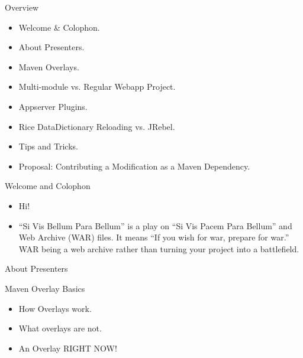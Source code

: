 \documentclass[xcolor=dvipsnames,14pt,professionalfonts]{beamer}
\begin{document}
\begin{frame}{Overview}
  \begin{itemize}
  \item Welcome \& Colophon.
  \item About Presenters.
  \item Maven Overlays.
  \item Multi-module vs. Regular Webapp Project.
  \item Appserver Plugins.
  \item Rice DataDictionary Reloading vs. JRebel.
  \item Tips and Tricks.
  \item Proposal: Contributing a Modification as a Maven Dependency.
  \end{itemize}
\end{frame}

\begin{frame}{Welcome and Colophon}
  \begin{itemize}
    \item Hi!
    \item ``Si Vis Bellum Para Bellum'' is a play on ``Si Vis Pacem
      Para Bellum'' and Web Archive (WAR) files. It means ``If you
      wish for war, prepare for war.'' WAR being a web archive rather than turning your project into a battlefield.
  \end{itemize}
\end{frame}

\begin{frame}{About Presenters}
\end{frame}

\begin{frame}{Maven Overlay Basics}
  \begin{itemize}
    \item How Overlays work.
    \item What overlays are not.
    \item An Overlay RIGHT NOW!
    \end{itemize}
\end{frame}
\end{document}
